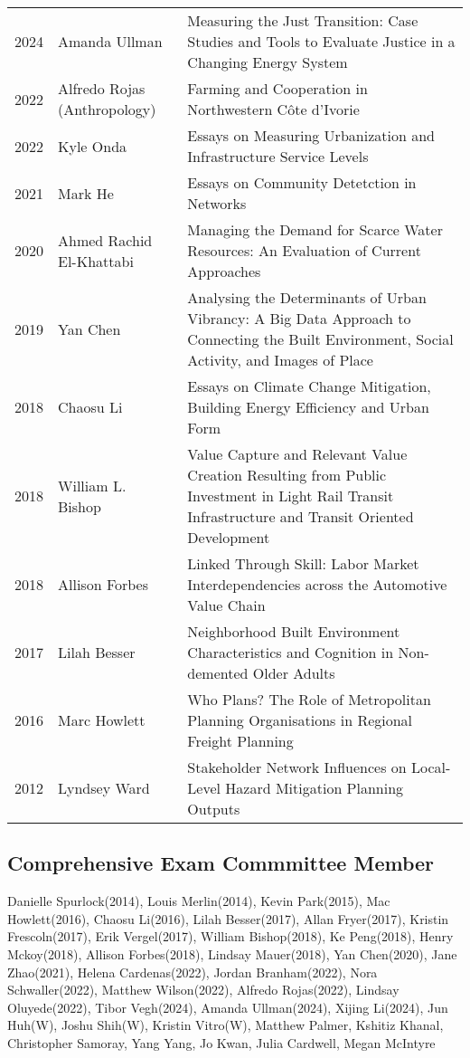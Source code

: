 \documentclass[11pt,a4paper,]{awesome-cv}
\begin{document}
\begin{tabular}{lp{3cm}p{12cm}}
  2024 & Amanda Ullman & Measuring the Just Transition: Case Studies and Tools to Evaluate Justice in a Changing Energy System \\ 
  2022 & Alfredo Rojas (Anthropology) & Farming and Cooperation in Northwestern Côte d'Ivorie \\ 
  2022 & Kyle Onda & Essays on Measuring Urbanization and Infrastructure Service Levels \\ 
  2021 & Mark He & Essays on Community Detetction in Networks \\ 
  2020 & Ahmed Rachid El-Khattabi & Managing the Demand for Scarce Water Resources: An Evaluation of Current Approaches \\ 
  2019 & Yan Chen & Analysing the Determinants of Urban Vibrancy: A Big Data Approach to Connecting the Built Environment, Social Activity, and Images of Place \\ 
  2018 & Chaosu Li & Essays on Climate Change Mitigation, Building Energy Efficiency and Urban Form \\ 
  2018 & William L. Bishop & Value Capture and Relevant Value Creation Resulting from Public Investment in Light Rail Transit Infrastructure and Transit Oriented Development \\ 
  2018 & Allison Forbes & Linked Through Skill: Labor Market Interdependencies across the Automotive Value Chain \\ 
  2017 & Lilah Besser & Neighborhood Built Environment Characteristics and Cognition in Non-demented Older Adults \\ 
  2016 & Marc Howlett & Who Plans? The Role of Metropolitan Planning Organisations in Regional Freight Planning \\ 
  2012 & Lyndsey Ward & Stakeholder Network Influences on Local-Level Hazard Mitigation Planning Outputs \\ 
  \end{tabular}

\subsection{Comprehensive Exam Commmittee
Member}\label{comprehensive-exam-commmittee-member}

Danielle Spurlock(2014), Louis Merlin(2014), Kevin Park(2015), Mac
Howlett(2016), Chaosu Li(2016), Lilah Besser(2017), Allan Fryer(2017),
Kristin Frescoln(2017), Erik Vergel(2017), William Bishop(2018), Ke
Peng(2018), Henry Mckoy(2018), Allison Forbes(2018), Lindsay
Mauer(2018), Yan Chen(2020), Jane Zhao(2021), Helena Cardenas(2022),
Jordan Branham(2022), Nora Schwaller(2022), Matthew Wilson(2022),
Alfredo Rojas(2022), Lindsay Oluyede(2022), Tibor Vegh(2024), Amanda
Ullman(2024), Xijing Li(2024), Jun Huh(W), Joshu Shih(W), Kristin
Vitro(W), Matthew Palmer, Kshitiz Khanal, Christopher Samoray, Yang
Yang, Jo Kwan, Julia Cardwell, Megan McIntyre
\end{document}
